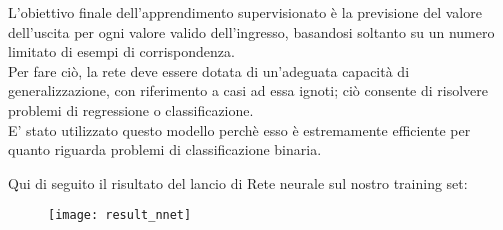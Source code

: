 L'obiettivo finale dell'apprendimento supervisionato è la previsione del valore dell'uscita per ogni valore valido dell'ingresso, basandosi soltanto su un numero limitato di esempi di corrispondenza.\\
Per fare ciò, la rete deve essere dotata di un'adeguata capacità di generalizzazione, con riferimento a casi ad essa ignoti; ciò consente di risolvere problemi di regressione o classificazione.\\
E' stato utilizzato questo modello perchè esso è estremamente efficiente per quanto riguarda problemi di classificazione binaria.

\newpage

Qui di seguito il risultato del lancio di Rete neurale sul nostro training set:

\begin{figure}[H]
	\centering
	\texttt{[image: result\_nnet]}
\end{figure}






